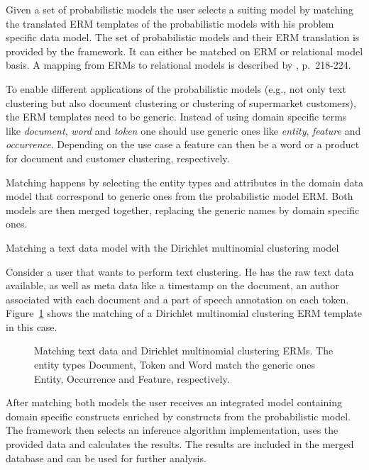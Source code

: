 Given a set of probabilistic models the user selects a suiting model by matching the translated ERM templates of the probabilistic models with his problem specific data model. The set of probabilistic models and their ERM translation is provided by the framework. It can either be matched on ERM or relational model basis. A mapping from ERMs to relational models is described by \textcite{elmasri2007database}, p.~218-224.

To enable different applications of the probabilistic models (e.g., not only text clustering but also document clustering or clustering of supermarket customers), the ERM templates need to be generic. Instead of using domain specific terms like \emph{document}, \emph{word} and \emph{token} one should use generic ones like \emph{entity}, \emph{feature} and \emph{occurrence}. Depending on the use case a feature can then be a word or a product for document and customer clustering, respectively.

Matching happens by selecting the entity types and attributes in the domain data model that correspond to generic ones from the probabilistic model ERM. Both models are then merged together, replacing the generic names by domain specific ones.

\begin{Example} Matching a text data model with the Dirichlet multinomial clustering model

Consider a user that wants to perform text clustering. He has the raw text data available, as well as meta data like a timestamp on the document, an author associated with each document and a part of speech annotation on each token. Figure~\ref{fig:matching_clustering} shows the matching of a Dirichlet multinomial clustering ERM template in this case.

\vspace*{1em}
\begin{figure}[h!]
\centering
\scalebox{0.5}{\adjustTikzSize }
\caption{Matching text data and Dirichlet multinomial clustering ERMs. The entity types Document, Token and Word match the generic ones Entity, Occurrence and Feature, respectively.}\label{fig:matching_clustering}
\end{figure}

\end{Example}

After matching both models the user receives an integrated model containing domain specific constructs enriched by constructs from the probabilistic model. The framework then selects an inference algorithm implementation, uses the provided data and calculates the results. The results are included in the merged database and can be used for further analysis.




